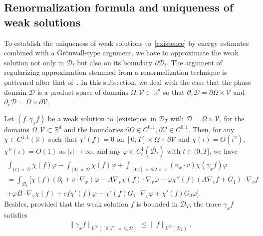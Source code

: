 \documentclass[AHL,Unicode,longabstracts,published]{cedram}
\newcommand*\p{\partial}
\newcommand*\R {\mathbb{R}}
\newcommand*\V {\mathcal{V}}
\newcommand*\D {\mathcal{D}}
\begin{document}
\subsection{Renormalization formula and uniqueness of weak solutions}\label{RU}
To establish the uniqueness of weak solutions to~\eqref{existence} by energy estimates combined with a Gr\"onwall-type argument, we have to approximate the weak solution not only in $\D_t$ but also on its boundary $\p\D_t$. The argument of regularizing approximation stemmed from a renormalization technique is patterned after that of~\cite{Mischler3}. In this subsection, we deal with the case that the phase domain $\D$ is a product space of domains $\Omega,\V\subset\R^d$ so that $\p_x\D=\p\Omega\times\V$ and $\p_v\D=\Omega\times\p\V$.

\begin{lemm}\label{trace}
Let $(f,\gamma_xf)$ be a weak solution to~\eqref{existence} in $\D_T$ with $\D=\Omega\times\V$, for the domains $\Omega,\V\subset\R^d$ and the boundaries $\p\Omega\in C^{0,1},\p\V\in C^{0,1}$. Then, for any $\chi\in C^{1,1}(\R)$ such that $\chi'(f)=0$ on $[0,T]\times\Omega\times\p\V$ and $\chi(\iota)=O(\iota^2)$, $\chi''(\iota)=O(1)$ as $|\iota|\rightarrow\infty$, and any $\varphi\in C^1_c(\overline{\D_t})$ with $t\in(0,T]$, we have
\begin{multline}\label{ren}
\int_{\{t\}\,\times\,\D} \chi(f)\varphi -\int_{\{0\}\,\times\,\D}\chi(f)\varphi + \int_{[0,t]\,\times\,\p\Omega\,\times\,\V} (n_x\cdot v) \chi(\gamma_xf)\varphi\\
=\int_{\D_t} \big[\chi(f)(\p_t+v\cdot\nabla_x)\varphi -A\nabla_v\chi(f) \cdot\nabla_v\varphi - \varphi\chi''(f)(A\nabla_vf+G_1)\cdot\nabla_vf\\
+ \varphi B\cdot\nabla_v\chi(f) + c f\chi'(f)\varphi -\chi'(f) G_1\cdot\nabla_v\varphi + \chi'(f)G_0\varphi\big].
\end{multline}
Besides, provided that the weak solution $f$ is bounded in $\D_T$, the trace $\gamma_xf$ satisfies
\begin{align*}
\|\gamma_xf\|_{L^\infty([0,T]\,\times\,\p_x\D)}\le\|f\|_{L^\infty(\D_T)}.
\end{align*}
\end{lemm}
\end{document}
